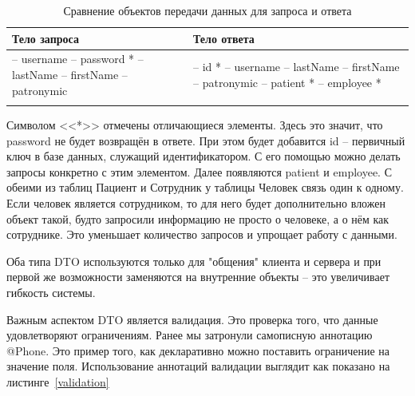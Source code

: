 \documentclass[a4paper,article]{article}
\begin{document}
        \begin{xltabular}{\textwidth} { |
            >{\hsize} X |
            >{\hsize} X | }
        
        \hline
        Тело запроса
        & Тело ответа \\
        
        \hline
        -- username \newline -- password * \newline -- lastName \newline -- firstName \newline -- patronymic
        & -- id * \newline -- username \newline -- lastName \newline -- firstName \newline -- patronymic \newline -- patient * \newline -- employee * \\
        
        \hline
        
        \caption{\centering Сравнение объектов передачи данных для запроса и ответа}
        
        \label{tab:Сравнение объектов передачи данных для запроса и ответа}
    \end{xltabular}
    
    Символом <<*>> отмечены отличающиеся элементы. Здесь это значит, что password не будет возвращён в ответе. При этом будет добавится id -- первичный ключ в базе данных, служащий идентификатором. С его помощью можно делать запросы конкретно с этим элементом. Далее появляются patient и employee. С обеими из таблиц Пациент и Сотрудник у таблицы Человек связь один к одному. Если человек является сотрудником, то для него будет дополнительно вложен объект такой, будто запросили информацию не просто о человеке, а о нём как сотруднике. Это уменьшает количество запросов и упрощает работу с данными.
    
    Оба типа DTO используются только для "общения" клиента и сервера и при первой же возможности заменяются на внутренние объекты -- это увеличивает гибкость системы.
    
    Важным аспектом DTO является валидация. Это проверка того, что данные удовлетворяют ограничениям. Ранее мы затронули самописную аннотацию @Phone. Это пример того, как декларативно можно поставить ограничение на значение поля. Использование аннотаций валидации выглядит как показано на листинге~\ref{validation}
    
\end{document}
